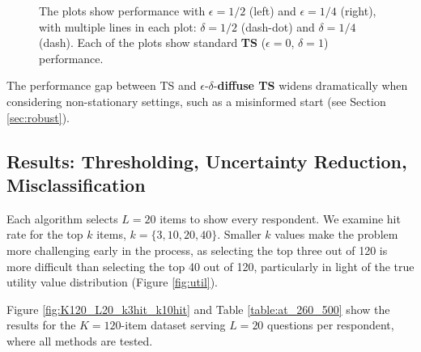 \documentclass[a4paper,11pt]{article}
\newcommand{\ts}{\textbf{TS} }
\newcommand{\edts}{$\epsilon$-$\delta$-\textbf{diffuse TS} }
\newcommand{\numperset}{L}
\begin{document}
\begin{figure}
\caption{The plots show performance with $\epsilon = 1/2$ (left) and $\epsilon = 1/4$ (right), with multiple lines in each plot: $\delta = 1/2$ (dash-dot) and $\delta = 1/4$ (dash). Each of the plots show standard \ts ($\epsilon = 0$, $\delta =1$) performance.}
\label{fig:effects_epsilon_delta}
 	\begin{center}
    \qquad
    \end{center}
\end{figure}

The performance gap between TS and \edts widens dramatically when considering non-stationary settings, such as a misinformed start (see Section \ref{sec:robust}). 

\subsection{Results: Thresholding, Uncertainty Reduction, Misclassification}

Each algorithm selects $\numperset=20$ items to show every respondent. We examine hit rate for the top $k$ items, $k = \{3,10,20,40\}$. Smaller $k$ values make the problem more challenging early in the process, as selecting the top three out of 120 is more difficult than selecting the top 40 out of 120, particularly in light of the true utility value distribution (Figure \ref{fig:util}).  


Figure \ref{fig:K120_L20_k3hit_k10hit} and Table \ref{table:at_260_500} show the results for the $K=120$-item dataset serving $\numperset=20$ questions per respondent, where all methods are tested.
\end{document}
